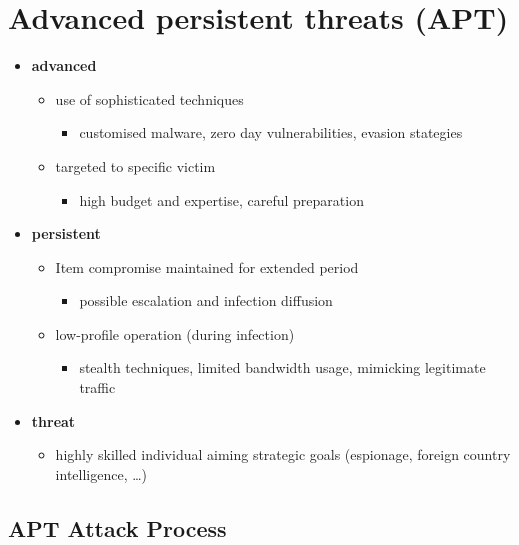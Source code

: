 \section{Advanced persistent threats (APT)}
\begin{itemize}[itemsep=0pt, topsep=0pt]
    \item \textbf{advanced}
    \begin{itemize}[itemsep=0pt, topsep=0pt]
        \item use of sophisticated techniques
        \begin{itemize}[itemsep=0pt, topsep=0pt]
            \item customised malware, zero day vulnerabilities, evasion stategies
        \end{itemize}
        \item targeted to specific victim
        \begin{itemize}[itemsep=0pt, topsep=0pt]
            \item high budget and expertise, careful preparation
        \end{itemize}
    \end{itemize}
    \item \textbf{persistent}
    \begin{itemize}[itemsep=0pt, topsep=0pt]
        \item Item compromise maintained for extended period
        \begin{itemize}[itemsep=0pt, topsep=0pt]
            \item possible escalation and infection diffusion
        \end{itemize}
        \item low-profile operation (during infection)
        \begin{itemize}[itemsep=0pt, topsep=0pt]
            \item stealth techniques, limited bandwidth usage, mimicking legitimate traffic
        \end{itemize}
    \end{itemize}
    \item \textbf{threat}
    \begin{itemize}[itemsep=0pt, topsep=0pt]
        \item highly skilled individual aiming strategic goals (espionage, foreign country intelligence, …)
    \end{itemize}
\end{itemize}


\subsection{APT Attack Process}


